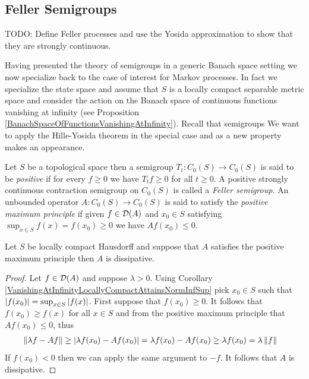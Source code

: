 \subsection{Feller Semigroups}

TODO: Define Feller processes and use the Yosida approximation to show that they are strongly continuous.

Having presented the theory of semigroups in a generic Banach space setting we now specialize back to the case of interest for Markov processes.  In fact we specialize the state space and assume that $S$ is a locally compact separable metric space and consider the action on the Banach space of continuous functions vanishing at infinity (see Proposition 
\ref{BanachSpaceOfFunctionsVanishingAtInfinity}).  Recall that semigroups We want to apply the Hille-Yosida theorem  in the special case and as a new property makes an appearance.

\begin{defn}Let $S$ be a topological space then a semigroup $T_t : C_0(S) \to C_0(S)$ is said to be \emph{positive} if for every $f \geq 0$ we have $T_t f \geq 0$ for all $t \geq 0$. 
A positive strongly continuous contraction semigroup on $C_0(S)$ is called a \emph{Feller semigroup}.   An unbounded operator $A : C_0(S) \to C_0(S)$ is said to satisfy the \emph{positive maximum principle} if given $f \in \mathcal{D}(A)$ and $x_0 \in S$ satisfying $\sup_{x \in S} f(x) = f(x_0) \geq 0$ we have $Af(x_0) \leq 0$.
\end{defn}


\begin{lem}\label{PositiveMaximumPrincipleDissipative}Let $S$ be locally compact Hausdorff and suppose that $A$ satisfies the positive maximum principle then $A$ is dissipative.
\end{lem}
\begin{proof}
Let $f \in \mathcal{D}(A)$ and suppose $\lambda > 0$.  Using Corollary \ref{VanishingAtInfinityLocallyCompactAttainsNormInfSup} pick $x_0 \in S$  such that $\left \vert f(x_0) \right \vert = \sup_{x \in S} \left \vert f(x) \right \vert$.  First suppose that $f(x_0) \geq 0$.  It follows that $f(x_0) \geq f(x)$ for all $x \in S$ and from the positive maximum principle that $Af(x_0) \leq 0$, thus
\begin{align*}
\left \lVert \lambda f - A f \right \rVert &\geq \left \vert \lambda f(x_0) - Af(x_0) \right \vert = \lambda f(x_0) - Af(x_0) \geq \lambda f(x_0) = \lambda \left \lVert f \right \rVert
\end{align*}
If $f(x_0) < 0$ then we can apply the same argument to $-f$.  It follows that $A$ is dissipative.
\end{proof}

